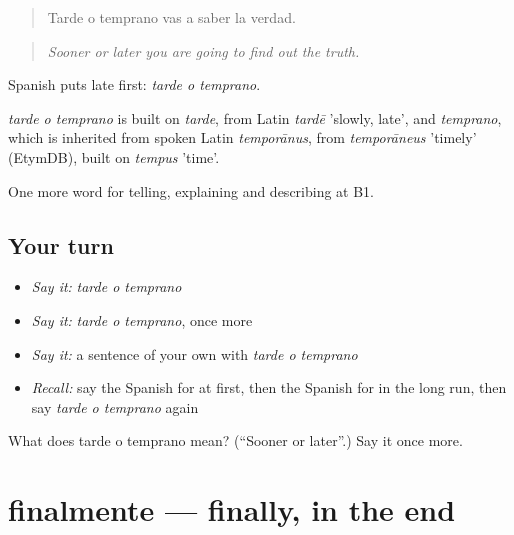 \begin{quote}
Tarde o temprano vas a saber la verdad.
\end{quote}

\begin{quote}
\emph{Sooner or later you are going to find out the truth.}
\end{quote}

Spanish puts late first: \emph{tarde o temprano}.

\begin{cousinweb}
\emph{tarde o temprano} is built on \emph{tarde}, from Latin \emph{tardē} 'slowly, late', and \emph{temprano}, which is inherited from spoken Latin \emph{temporānus}, from \emph{temporāneus} 'timely' (EtymDB), built on \emph{tempus} 'time'.
\end{cousinweb}

\begin{grammarlens}[title={What you've built}]
One more word for telling, explaining and describing at B1.
\end{grammarlens}

\subsection*{Your turn}
\begin{itemize}
\raggedright
  \item \emph{Say it:} \emph{tarde o temprano}
  \item \emph{Say it:} \emph{tarde o temprano}, once more
  \item \emph{Say it:} a sentence of your own with \emph{tarde o temprano}
  \item \emph{Recall:} say the Spanish for at first, then the Spanish for in the long run, then say \emph{tarde o temprano} again
\end{itemize}

\begin{tcolorbox}[breakable,colback=teal!4,colframe=teal!35!black,title={Before you move on}]
What does tarde o temprano mean? (\textquotedblleft{}Sooner or later\textquotedblright{}.) Say it once more.
\end{tcolorbox}
\section[finalmente]{finalmente — finally, in the end}

\label{lesson:ES-C535-finalmente}



